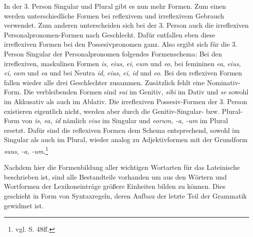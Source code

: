 In der 3. Person Singular und Plural gibt es nun mehr Formen. Zum einen werden unterschiedliche Formen bei reflexivem und irreflexivem Gebrauch verwendet. Zum anderen unterscheiden sich bei der 3. Person auch die irreflexiven Personalpronomen-Formen nach Geschlecht. Dafür entfallen eben diese irreflexiven Formen bei den Possesivpronomen ganz. Also ergibt sich für die 3. Person Singular der Personalpronomen folgendes Formenschema: Bei den irreflexiven, maskulinen Formen \textit{is}, \textit{eius}, \textit{ei}, \textit{eum} und \textit{eo}, bei femininen \textit{ea}, \textit{eius}, \textit{ei}, \textit{eam} und \textit{ea} und bei Neutra \textit{id}, \textit{eius}, \textit{ei}, \textit{id} und \textit{eo}. Bei den reflexiven Formen fallen wieder alle drei Geschlechter zusammen. Zusätzlich fehlt eine Nominativ-Form. Die verbleibenden Formen sind \textit{sui} im Genitiv, \textit{sibi} im Dativ und \textit{se} sowohl im Akkusativ als auch im Ablativ. Die irreflexiven Possesiv-Formen der 3. Person existieren eigentlich nicht, werden aber durch die Genitiv-Singular- bzw. Plural-Form von \textit{is, ea, id} nämlich \textit{eius} im Singular und \textit{eorum, -a, -um} im Plural ersetzt. Dafür sind die reflexiven Formen dem Schema entsprechend, sowohl im Singular als auch im Plural, wieder analog zu Adjektivformen mit der Grundform \textit{suus, -a, -um}.\footnote{vgl. \cite{BAYER-LINDAUER1994} S. 48ff.} \par
Nachdem hier die Formenbildung aller wichtigen Wortarten für das Lateinische beschrieben ist, sind alle Bestandteile vorhanden um aus den Wörtern und Wortformen der Lexikoneinträge größere Einheiten bilden zu können. Dies geschieht in Form von Syntaxregeln, deren Aufbau der letzte Teil der Grammatik gewidmet ist.
